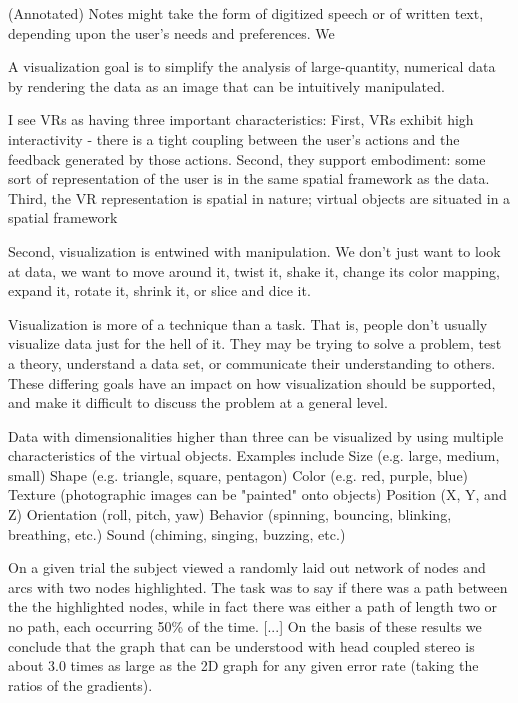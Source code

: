 (Annotated) Notes might take the form of digitized speech or of written text, depending upon the user’s needs and preferences. We
\cite{Ribarsky1994}

A visualization goal is to simplify the analysis of large-quantity, numerical data by rendering the data as an image that can be intuitively manipulated.
\cite{Stone1994}

I see VRs as having three important characteristics: First, VRs exhibit high interactivity - there is a tight coupling between the user's actions and the feedback generated by those actions. Second, they support embodiment: some sort of representation of the user is in the same spatial framework as the data. Third, the VR representation is spatial in nature; virtual objects are situated in a spatial framework
\cite{Stone1994}

Second, visualization is entwined with manipulation. We don't just want to look at data, we want to move around it, twist it, shake it, change its color mapping, expand it, rotate it, shrink it, or slice and dice it.
\cite{Stone1994}

Visualization is more of a technique than a task. That is, people don't usually visualize data just for the hell of it. They may be trying to solve a problem, test a theory, understand a data set, or communicate their understanding to others. These differing goals have an impact on how visualization should be supported, and make it difficult to discuss the problem at a general level. 
\cite{Stone1994}

Data with dimensionalities higher than three can be visualized by using multiple characteristics of the virtual objects. Examples include
Size (e.g. large, medium, small)
Shape (e.g. triangle, square, pentagon)
Color (e.g. red, purple, blue)
Texture (photographic images can be "painted" onto objects)
Position (X, Y, and Z)
Orientation (roll, pitch, yaw)
Behavior (spinning, bouncing, blinking, breathing, etc.)
Sound (chiming, singing, buzzing, etc.)
\cite{Stone1994}

On a given trial the subject viewed a randomly laid out network of nodes and arcs with two nodes highlighted. The task was to say if there was a path between the the highlighted nodes, while in fact there was either a path of length two or no path, each occurring 50\% of the time. [...]
On the basis of these results we conclude that the graph that can be understood with head coupled stereo is about 3.0 times as large as the 2D graph for any given error rate (taking the ratios of the gradients).
\cite{Ware1994}

